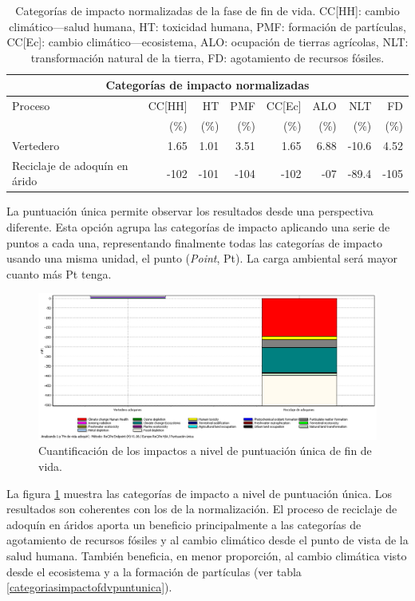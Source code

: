 \begin{table}[!htb]
\centering
\begin{tabular}{p{4cm}rrrrrrr}
\toprule
\multicolumn{8}{c}{Categorías de impacto normalizadas}\\
\midrule
Proceso & CC[HH] & HT & PMF & CC[Ec] & ALO & NLT & FD\\
 &  (\%) & (\%) & (\%) & (\%) & (\%) & (\%) & (\%)\\
\midrule
Vertedero & 1.65 & 1.01 & 3.51 & 1.65 & 6.88 & -10.6 & 4.52\\
Reciclaje de adoquín en árido & -102 & -101 & -104 & -102 & -07 & -89.4 & -105\\
\bottomrule
\end{tabular}
\caption[Categorías de impacto normalizadas de la fase de fin de vida.]{Categorías de impacto normalizadas de la fase de fin de vida. CC[HH]: cambio climático—salud humana, HT: toxicidad humana, PMF: formación de partículas, CC[Ec]: cambio climático—ecosistema, ALO: ocupación de tierras agrícolas, NLT: transformación natural de la tierra, FD: agotamiento de recursos fósiles.}
\label{categoriasimpactofdv}
\end{table}

La puntuación única permite observar los resultados desde una perspectiva diferente. Esta opción agrupa las categorías de impacto aplicando una serie de puntos a cada una, representando finalmente todas las categorías de impacto usando una misma unidad, el punto (\textit{Point}, Pt). La carga ambiental será mayor cuanto más Pt tenga.

\begin{figure}[!htb]
\centering
\includegraphics[width=15cm]{img/fdv_puntuacionunica.png}
\caption{Cuantificación de los impactos a nivel de puntuación única de fin de vida.}
\label{fig:fdv_puntuacionunica}
\end{figure}

La figura \ref{fig:fdv_puntuacionunica} muestra las categorías de impacto a nivel de puntuación única. Los resultados son coherentes con los de la normalización. El proceso de reciclaje de adoquín en áridos aporta un beneficio principalmente a las categorías de agotamiento de recursos fósiles y al cambio climático desde el punto de vista de la salud humana. También beneficia, en menor proporción, al cambio climática visto desde el ecosistema y a la formación de partículas (ver tabla \ref{categoriasimpactofdvpuntunica}).

